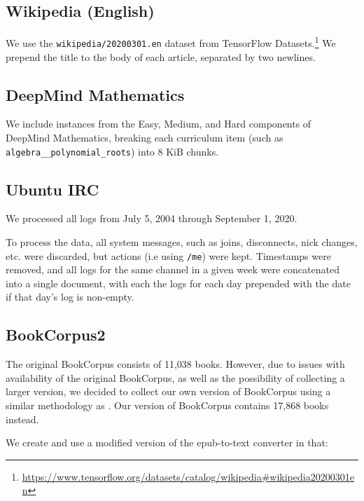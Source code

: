 \documentclass[11pt,a4paper]{article}
\begin{document}
\begin{appendices}
\subsection{Wikipedia (English)}

We use the \texttt{wikipedia/20200301.en} dataset from TensorFlow Datasets.\footnote{\url{https://www.tensorflow.org/datasets/catalog/wikipedia\#wikipedia20200301en}} We prepend the title to the body of each article, separated by two newlines. 


\subsection{DeepMind Mathematics}

We include instances from the Easy, Medium, and Hard components of DeepMind Mathematics, breaking each curriculum item (such as {\tt algebra\_\_polynomial\_roots}) into 8 KiB chunks.


\subsection{Ubuntu IRC}

We processed all logs from July 5, 2004 through September 1, 2020.

To process the data, all system messages, such as joins, disconnects, nick changes, etc. were discarded, but actions (i.e using {\tt /me}) were kept. Timestamps were removed, and all logs for the same channel in a given week were concatenated into a single document, with each the logs for each day prepended with the date if that day's log is non-empty.


\subsection{BookCorpus2}

The original BookCorpus consists of 11,038 books. However, due to issues with availability of the original BookCorpus, as well as the possibility of collecting a larger version, we decided to collect our own version of BookCorpus using a similar methodology as \citet{BookCorpusCode}. Our version of BookCorpus contains 17,868 books instead.

We create and use a modified version of the epub-to-text converter in \citet{BookCorpusCode} that:


\end{appendices}
\end{document}
